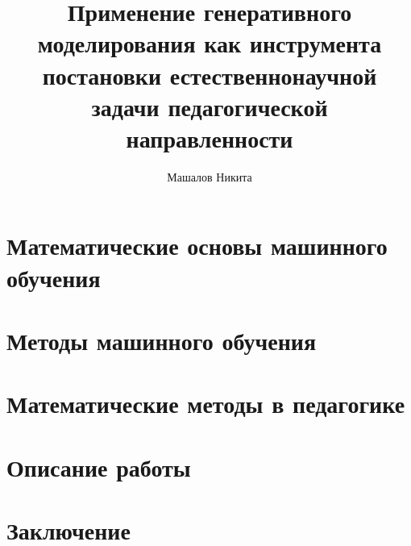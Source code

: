 \documentclass{mipt-thesis-bs}
\title{Применение генеративного моделирования как инструмента постановки естественнонаучной задачи педагогической направленности}
\author{Машалов Никита}
\begin{document}

\tableofcontents

\pagebreak


\chapter{Математические основы машинного обучения}

\chapter{Методы машинного обучения}

\chapter{Математические методы в педагогике}

\chapter{Описание работы}

\chapter{Заключение}


\printbib


\end{document}

